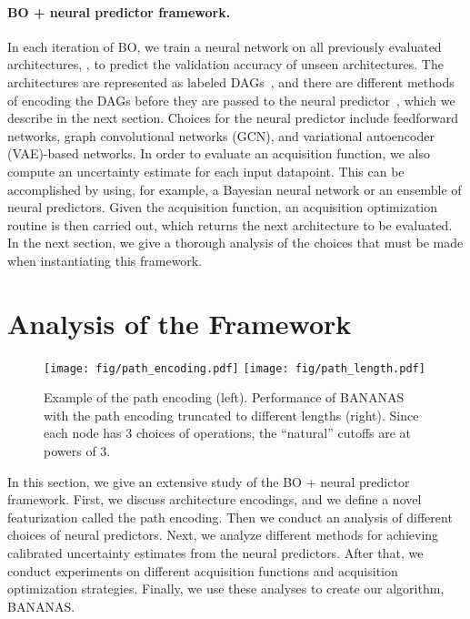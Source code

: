 \documentclass[11pt]{article}
\numberwithin{equation}{section}
\numberwithin{figure}{section}
\theoremstyle{plain}
\theoremstyle{definition}
\newcounter{Frame}
\begin{document}
\paragraph{BO + neural predictor framework.}
In each iteration of BO, we train a neural network
on all previously evaluated architectures, , to predict the validation
accuracy  of unseen architectures.
The architectures are represented as labeled DAGs~\cite{nasbench, nasbench201},
and there are different methods of encoding the DAGs before they are passed to
the neural predictor~\cite{nasbench, white2020study}, 
which we describe in the next section.
Choices for the neural predictor include feedforward networks, 
graph convolutional networks (GCN),
and variational autoencoder (VAE)-based networks.
In order to evaluate an acquisition function, we also compute an uncertainty
estimate for each input datapoint. This can be accomplished by using,
for example, a Bayesian neural network or an ensemble of neural predictors.
Given the acquisition function, an acquisition optimization routine is then 
carried out, which returns the next architecture to be evaluated.
In the next section, we give a thorough analysis of the choices that
must be made when instantiating this framework.


 
\section{Analysis of the Framework}
\label{sec:methodology}

\begin{comment}
\begin{figure}
\centering
    \texttt{[image: fig/path\_encoding.pdf]}
    \caption{Example of the path encoding.}
    \label{fig:path_encoding_figure}
\end{figure}
\end{comment}


\begin{figure*}[h]
\centering
\texttt{[image: fig/path\_encoding.pdf]}
\hspace{1cm}
\texttt{[image: fig/path\_length.pdf]}
\caption{Example of the path encoding (left).
Performance of BANANAS with the path encoding truncated to different
lengths (right). Since each node has 3 choices of operations, the ``natural''
cutoffs are at powers of 3.
}
\label{fig:path_encoding}
\end{figure*}


In this section, we give an extensive study of the BO + neural predictor
framework. First, we discuss architecture encodings, and we define a novel
featurization called the path encoding.
Then we conduct an analysis of different choices of neural predictors.
Next, we analyze different methods for achieving calibrated uncertainty
estimates from the neural predictors.
After that, we conduct experiments on different acquisition functions
and acquisition optimization strategies.
Finally, we use these analyses to create our algorithm, BANANAS.
\end{document}
